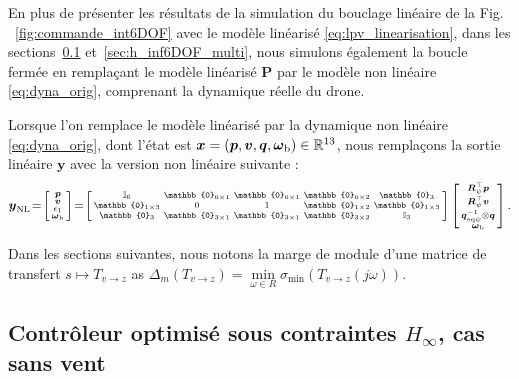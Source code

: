 En plus de présenter les résultats de la simulation du bouclage linéaire de la Fig. ~\ref{fig:commande_int6DOF} avec le modèle linéarisé \eqref{eq:lpv_linearisation}, dans les sections~\ref{sec:zerowind} et~\ref{sec:h_inf6DOF_multi}, nous simulons également la boucle fermée en remplaçant le modèle linéarisé $\boldsymbol{P}$ par le modèle non linéaire \eqref{eq:dyna_orig}, comprenant la dynamique réelle du drone.

Lorsque l'on remplace le modèle linéarisé par la dynamique non linéaire \eqref{eq:dyna_orig}, dont l'état est $\boldsymbol{x} = (\boldsymbol{p}, \boldsymbol{v}, \boldsymbol{q},\boldsymbol{\omega}_{\text{b}}) \in {\mathbb R}^{13} $, nous remplaçons la sortie linéaire $\boldsymbol{y}$ avec la version non linéaire suivante :
\begin{align}
\label{eq:output}
    \boldsymbol{y}_{\text{NL}} \!=\! \smallmat{\boldsymbol{p}\\
     \boldsymbol{v}\\
     \epsilon_{1}\\
     \boldsymbol{\omega}_{\text{b}}} \!=\! \left[ \begin{smallmatrix} \mathbb{I}_{6} & \mathbb{0}_{6\times 1} & \mathbb{0}_{6\times 1} & \mathbb{0}_{6\times 2} & \mathbb{0}_{3}\\
     \mathbb{0}_{1\times 3} & 0 & 1 & \mathbb{0}_{1\times 2} & \mathbb{0}_{1 \times 3} \\
         \mathbb{0}_{3} & \mathbb{0}_{3\times 1} & \mathbb{0}_{3\times 1} & \mathbb{0}_{3\times 2} &   \mathbb{I}_{3}
         \end{smallmatrix} \right]
         \smallmat{\boldsymbol{R}^\top_{\psi}\boldsymbol{p} \\ \boldsymbol{R}^\top_{\psi}\boldsymbol{v} \\
\boldsymbol{q}_{\mathrm{eq}\psi}^{-1} \otimes \boldsymbol{q} \\
         \boldsymbol{\omega}_{\text{b}}  }.
\end{align}


Dans les sections suivantes, nous notons la marge de module d'une matrice de transfert $s \mapsto T_{v \rightarrow z}$ as $\Delta_m(T_{v \rightarrow z}) = \min\limits_{\omega\in R} \sigma_{\min}(T_{v \rightarrow z}(j\omega))$.



\subsection{Contrôleur optimisé sous contraintes $H_{\infty}$, cas sans vent}
\label{sec:zerowind}

